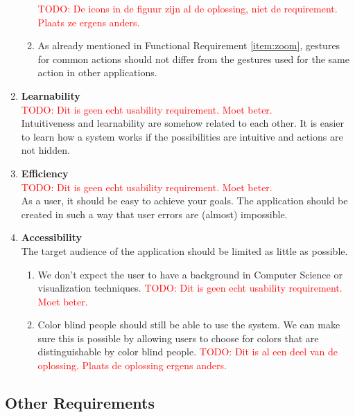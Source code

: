 \begin{enumerate}[label=\textbf{\arabic*}., ref=\arabic*]
\begin{enumerate}
		\textcolor{red}{TODO: De icons in de figuur zijn al de oplossing, niet de requirement. Plaats ze ergens anders.}
	
		\item As already mentioned in Functional Requirement \ref{item:zoom}, gestures for common actions should not differ from the gestures used for the same action in other applications.
				
	\end{enumerate}
	
	\item \textbf{Learnability\label{item:learnability}} \hfill \\
	\textcolor{red}{TODO: Dit is geen echt usability requirement. Moet beter.}\\
	Intuitiveness and learnability are somehow related to each other. It is easier to learn how a system works if the possibilities are intuitive and actions are not hidden.
	
	\item \textbf{Efficiency\label{item:efficiency}} \hfill \\
	\textcolor{red}{TODO: Dit is geen echt usability requirement. Moet beter.}\\
	As a user, it should be easy to achieve your goals. The application should be created in such a way that user errors are (almost) impossible.
	
	\item \textbf{Accessibility\label{item:accessibility}} \hfill \\
	The target audience of the application should be limited as little as possible. 
	\begin{enumerate}
		\item We don't expect the user to have a background in Computer Science or visualization techniques. \textcolor{red}{TODO: Dit is geen echt usability requirement. Moet beter.}
		\item Color blind people should still be able to use the system. We can make sure this is possible by allowing users to choose for colors that are distinguishable by color blind people. \textcolor{red}{TODO: Dit is al een deel van de oplossing. Plaats de oplossing ergens anders.}
	\end{enumerate}
	
\end{enumerate}



\subsection{Other Requirements}\label{sec:other-requirements}

